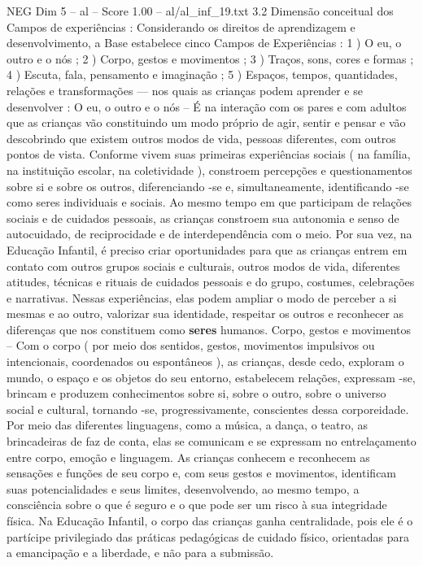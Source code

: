 \begin{textsample}{NEG Dim 5 – al – Score 1.00 – al/al\_inf\_19.txt}  \label{ex:f5_neg_248}
3.2 Dimensão conceitual dos Campos de experiências : Considerando os direitos de aprendizagem e desenvolvimento, a Base estabelece cinco Campos de Experiências : 1 ) O eu, o outro e o nós ; 2 ) Corpo, gestos e movimentos ; 3 ) Traços, sons, cores e formas ; 4 ) Escuta, fala, pensamento e imaginação ; 5 ) Espaços, tempos, quantidades, relações e transformações — nos quais as crianças podem aprender e se desenvolver : O eu, o outro e o nós – É na interação com os pares e com adultos que as crianças vão constituindo um modo próprio de agir, sentir e pensar e vão descobrindo que existem outros modos de vida, pessoas diferentes, com outros pontos de vista.
Conforme vivem suas primeiras experiências sociais ( na família, na instituição escolar, na coletividade ), constroem percepções e questionamentos sobre si e sobre os outros, diferenciando -se e, simultaneamente, identificando -se como seres individuais e sociais.
Ao mesmo tempo em que participam de relações sociais e de cuidados pessoais, as crianças constroem sua autonomia e senso de autocuidado, de reciprocidade e de interdependência com o meio.
Por sua vez, na Educação Infantil, é preciso criar oportunidades para que as crianças entrem em contato com outros grupos sociais e culturais, outros modos de vida, diferentes atitudes, técnicas e rituais de cuidados pessoais e do grupo, costumes, celebrações e narrativas.
Nessas experiências, elas podem ampliar o modo de perceber a si mesmas e ao outro, valorizar sua identidade, respeitar os outros e reconhecer as diferenças que nos constituem como \textbf{seres} humanos.
Corpo, gestos e movimentos – Com o corpo ( por meio dos sentidos, gestos, movimentos impulsivos ou intencionais, coordenados ou espontâneos ), as crianças, desde cedo, exploram o mundo, o espaço e os objetos do seu entorno, estabelecem relações, expressam -se, brincam e produzem conhecimentos sobre si, sobre o outro, sobre o universo social e cultural, tornando -se, progressivamente, conscientes dessa corporeidade.
Por meio das diferentes linguagens, como a música, a dança, o teatro, as brincadeiras de faz de conta, elas se comunicam e se expressam no entrelaçamento entre corpo, emoção e linguagem.
As crianças conhecem e reconhecem as sensações e funções de seu corpo e, com seus gestos e movimentos, identificam suas potencialidades e seus limites, desenvolvendo, ao mesmo tempo, a consciência sobre o que é seguro e o que pode ser um risco à sua integridade física.
Na Educação Infantil, o corpo das crianças ganha centralidade, pois ele é o partícipe privilegiado das práticas pedagógicas de cuidado físico, orientadas para a emancipação e a liberdade, e não para a submissão.

\end{textsample}
